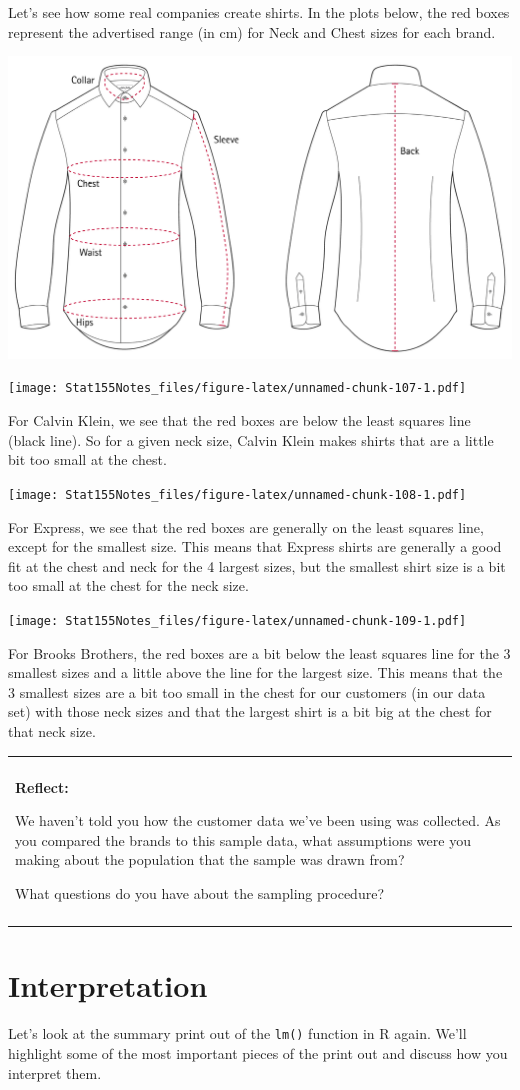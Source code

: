 \documentclass[]{book}
\newenvironment{reflect}
{
    \begin{center}
    
    \begin{tabular}{|p{0.8\textwidth}|}
    \rowcolor{LightBlue}
    \hline\\
    \rowcolor{LightBlue}
    \textbf{Reflect:}
}
{
    \\\rowcolor{LightBlue}
    \\\hline
    \end{tabular} 
    \end{center}
}
\begin{document}
Let's see how some real companies create shirts. In the plots below, the red boxes represent the advertised range (in cm) for Neck and Chest sizes for each brand.

\includegraphics[width=.25\textwidth]{Photos/shirtchart}

\texttt{[image: Stat155Notes\_files/figure-latex/unnamed-chunk-107-1.pdf]}

For Calvin Klein, we see that the red boxes are below the least squares line (black line). So for a given neck size, Calvin Klein makes shirts that are a little bit too small at the chest.

\texttt{[image: Stat155Notes\_files/figure-latex/unnamed-chunk-108-1.pdf]}

For Express, we see that the red boxes are generally on the least squares line, except for the smallest size. This means that Express shirts are generally a good fit at the chest and neck for the 4 largest sizes, but the smallest shirt size is a bit too small at the chest for the neck size.

\texttt{[image: Stat155Notes\_files/figure-latex/unnamed-chunk-109-1.pdf]}

For Brooks Brothers, the red boxes are a bit below the least squares line for the 3 smallest sizes and a little above the line for the largest size. This means that the 3 smallest sizes are a bit too small in the chest for our customers (in our data set) with those neck sizes and that the largest shirt is a bit big at the chest for that neck size.

\begin{reflect}
We haven't told you how the customer data we've been using was
collected. As you compared the brands to this sample data, what
assumptions were you making about the population that the sample was
drawn from?

What questions do you have about the sampling procedure?
\end{reflect}

\hypertarget{interpretation}{%
\section{Interpretation}\label{interpretation}}

Let's look at the summary print out of the \texttt{lm()} function in R again. We'll highlight some of the most important pieces of the print out and discuss how you interpret them.
\end{document}
